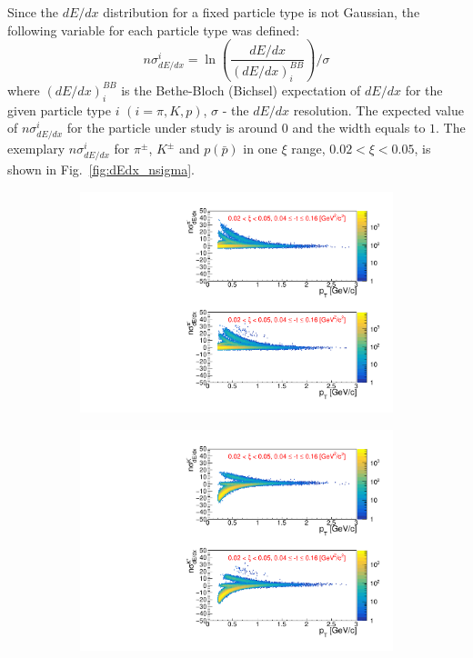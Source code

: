 \FloatBarrier
\noindent Since the $dE/dx$ distribution for a fixed particle type
is not Gaussian, the following variable for each particle type was defined:
\begin{equation}
n\sigma^i_{dE/dx}=\ln\left(\frac{dE/dx}{(dE/dx)_i^{BB}}\right)/\sigma
\label{eq:nsigma}
\end{equation}
where $(dE/dx)_i^{BB}$ is the Bethe-Bloch (Bichsel) expectation
of $dE/dx$ for the given particle type $i$ $(i =
\pi, K, p)$, $\sigma$ - the $dE/dx$ resolution.
The expected value of $n\sigma^i_{dE/dx}$ for the particle under study is around $0$  and the width equals to $1$. The exemplary $n\sigma^i_{dE/dx}$ for $\pi^{\pm}$, $K^\pm$ and $p(\bar{p})$ in one $\xi$ range, $0.02 < \xi < 0.05$, is shown  in Fig.~\ref{fig:dEdx_nsigma}.
\captionsetup{format=plain,indention=0pt,justification=justified}
\begin{figure}[hb]
	\centering
	\begin{subfigure}{.49\textwidth}
		\includegraphics[width=\linewidth, page=1]{chapters/chrgSTAR/img/dEdx/fit2019_2dNsigma_0_0.pdf}
	\end{subfigure}
	\begin{subfigure}{.49\textwidth}
		\includegraphics[width=\linewidth, page=1]{chapters/chrgSTAR/img/dEdx/fit2019_2dNsigma_0_1.pdf}

\end{subfigure}
\end{figure}

